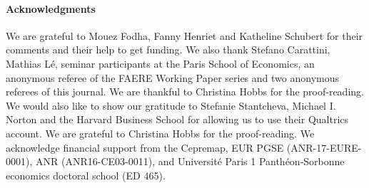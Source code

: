 \documentclass[english,5p,authoryear]{elsarticle}
\begin{document}
\paragraph*{Acknowledgments} We are grateful to Mouez Fodha, Fanny Henriet and Katheline Schubert for their comments and their help to get funding. We also thank Stefano Carattini, Mathias Lé, seminar participants at the Paris School of Economics, an anonymous referee of the FAERE Working Paper series and two anonymous referees of this journal. We are thankful to Christina Hobbs for the proof-reading. We would also like to show our gratitude to Stefanie Stantcheva, Michael I. Norton and the Harvard Business School for allowing us to use their Qualtrics account. We are grateful to Christina Hobbs for the proof-reading. We acknowledge financial support from the Cepremap, EUR PGSE (ANR-17-EURE-0001), ANR (ANR16-CE03-0011), and Université Paris 1 Panthéon-Sorbonne economics doctoral school (ED 465).


\newpage



\end{document}
